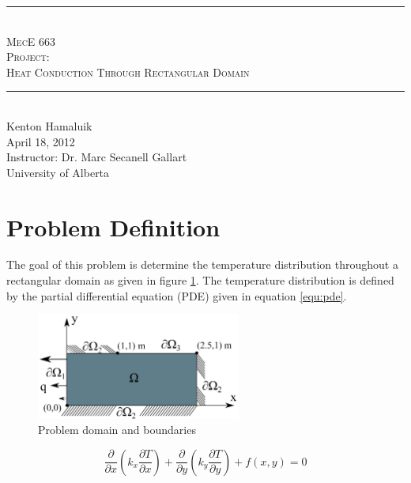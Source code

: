 \documentclass[letterpaper,10pt]{article}
\newcommand{\HRule}{\rule{\linewidth}{0.5mm}}
\begin{document}
\begin{center}
\vspace*{\fill}
\HRule \\[0.5cm]
\textsc{\LARGE MecE 663}\\
\textsc{\Large Project:}\\
\textsc{\large Heat Conduction Through Rectangular Domain}\\
\HRule \\[0.7cm]
Kenton Hamaluik\\[0.5cm]
April 18, 2012\\
Instructor: Dr. Marc Secanell Gallart\\
University of Alberta
\vspace*{\fill}
\end{center}
\pagebreak

\tableofcontents
\pagebreak
\listoffigures
\listoftables
\pagebreak

\pagestyle{fancyplain}
\fancyhf{}
\setcounter{page}{1}

\section{Problem Definition}
\label{sec:definition}
The goal of this problem is determine the temperature distribution throughout a rectangular domain as given in figure \ref{fig:domain}. The temperature distribution is defined by the partial differential equation (PDE) given in equation \ref{equ:pde}.

\begin{figure}[H]
	\centering
	\includegraphics[width=0.6\textwidth]{domain.png}
	\caption{Problem domain and boundaries}
	\label{fig:domain}
\end{figure}

\begin{equation}
\label{equ:pde}
\frac{\partial}{\partial x}\left(k_x\frac{\partial T}{\partial x}\right) + \frac{\partial}{\partial y}\left(k_y\frac{\partial T}{\partial y}\right) + f(x,y) = 0
\end{equation}
\end{document}
